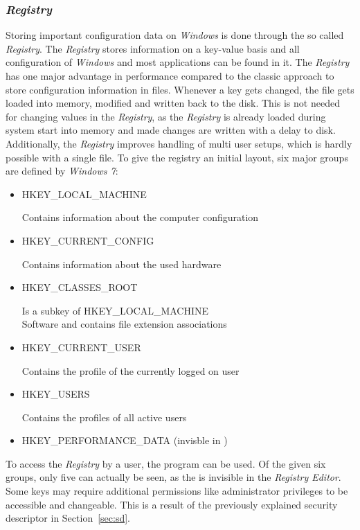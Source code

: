 \subsubsection{\emph{Registry}}
Storing important configuration data on \emph{Windows} is done through the so called \emph{Registry}. The \emph{Registry} stores information on a key-value basis and all configuration of \emph{Windows} and most applications can be found in it. The \emph{Registry} has one major advantage in performance compared to the classic approach to store configuration information in  files. Whenever a key gets changed, the  file gets loaded into memory, modified and written back to the disk. This is not needed for changing values in the \emph{Registry}, as the \emph{Registry} is already loaded during system start into memory and made changes are written with a delay to disk. Additionally, the \emph{Registry} improves handling of multi user setups, which is hardly possible with a single  file. To give the registry an initial layout, six major groups are defined by \emph{Windows 7}:
\begin{itemize}
\label{sec:registrykeys}
\item HKEY\_LOCAL\_MACHINE

Contains information about the computer configuration
\item HKEY\_CURRENT\_CONFIG

Contains information about the used hardware
\item HKEY\_CLASSES\_ROOT

Is a subkey of HKEY\_LOCAL\_MACHINE\\Software and contains file extension associations
\item HKEY\_CURRENT\_USER 

Contains the profile of the currently logged on user
\item HKEY\_USERS

Contains the profiles of all active users
\item HKEY\_PERFORMANCE\_DATA (invisble in )
\end{itemize}
To access the \emph{Registry} by a user, the  \cite{msdn_regedit} program can be used. Of the given six groups, only five can actually be seen, as the  is invisible in the \emph{Registry Editor}. Some keys may require additional permissions like administrator privileges to be accessible and changeable. This is a result of the previously explained security descriptor in Section~\ref{sec:sd}.